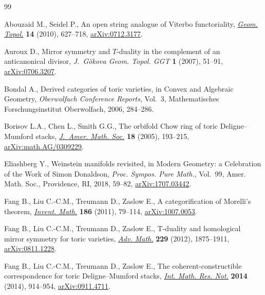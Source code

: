 \documentclass[10pt,a4paper]{amsart}
\numberwithin{equation}{section}
\begin{document}
\begin{thebibliography}{99}
\footnotesize\itemsep=0pt

Abouzaid M., Seidel P., An open string analogue of {V}iterbo functoriality,
 \href{https://doi.org/10.2140/gt.2010.14.627}{\textit{Geom. Topol.}} \textbf{14} (2010), 627--718, \href{https://arxiv.org/abs/0712.3177}{arXiv:0712.3177}.

Auroux D., Mirror symmetry and {$T$}-duality in the complement of an
 anticanonical divisor, \textit{J.~G\"okova Geom. Topol. GGT} \textbf{1}
 (2007), 51--91, \href{https://arxiv.org/abs/0706.3207}{arXiv:0706.3207}.

Bondal A., Derived categories of toric varieties, in Convex and Algebraic
 Geometry, \textit{Oberwolfach Conference Reports}, Vol.~3, Mathematisches
 Forschungsinstitut Oberwolfach, 2006, 284--286.

Borisov L.A., Chen L., Smith G.G., The orbifold {C}how ring of toric
 {D}eligne--{M}umford stacks, \href{https://doi.org/10.1090/S0894-0347-04-00471-0}{\textit{J.~Amer. Math. Soc.}} \textbf{18} (2005),
 193--215, \href{https://arxiv.org/abs/math.AG/0309229}{arXiv:math.AG/0309229}.

Eliashberg Y., Weinstein manifolds revisited, in Modern Geometry: a Celebration
 of the Work of {S}imon {D}onaldson, \textit{Proc. Sympos. Pure Math.},
 Vol.~99, Amer. Math. Soc., Providence, RI, 2018, 59--82, \href{https://arxiv.org/abs/1707.03442}{arXiv:1707.03442}.

Fang B., Liu C.-C.M., Treumann D., Zaslow E., A categorification of {M}orelli's
 theorem, \href{https://doi.org/10.1007/s00222-011-0315-x}{\textit{Invent. Math.}} \textbf{186} (2011), 79--114,
 \href{https://arxiv.org/abs/1007.0053}{arXiv:1007.0053}.

Fang B., Liu C.-C.M., Treumann D., Zaslow E., T-duality and homological mirror
 symmetry for toric varieties, \href{https://doi.org/10.1016/j.aim.2011.10.022}{\textit{Adv. Math.}} \textbf{229} (2012),
 1875--1911, \href{https://arxiv.org/abs/0811.1228}{arXiv:0811.1228}.

Fang B., Liu C.-C.M., Treumann D., Zaslow E., The coherent-constructible
 correspondence for toric {D}eligne--{M}umford stacks, \href{https://doi.org/10.1093/imrn/rns235}{\textit{Int. Math. Res.
 Not.}} \textbf{2014} (2014), 914--954, \href{https://arxiv.org/abs/0911.4711}{arXiv:0911.4711}.


\end{thebibliography}
\end{document}
